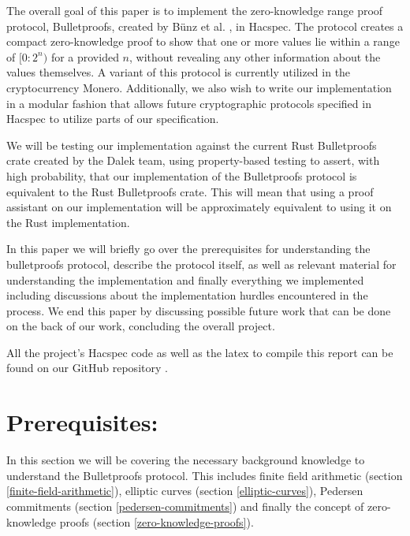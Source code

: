 \documentclass{article}
\begin{document}
The overall goal of this paper is to implement the zero-knowledge
range proof protocol, Bulletproofs, created by Bünz et
al. \cite{bulletproofs}, in Hacspec. The protocol creates a compact
zero-knowledge proof to show that one or more values lie within a
range of $[0:2^n)$ for a provided $n$, without revealing any other
information about the values themselves. A variant of this protocol
is currently utilized in the cryptocurrency Monero. Additionally,
we also wish to write our implementation in a modular fashion that
allows future cryptographic protocols specified in Hacspec to utilize
parts of our specification.

We will be testing our implementation against the current Rust
Bulletproofs crate \cite{dalek} created by the Dalek team, using property-based
testing to assert, with high probability, that our implementation of the
Bulletproofs protocol is equivalent to the Rust Bulletproofs crate. This
will mean that using a proof assistant on our implementation will be 
approximately equivalent to using it on the Rust implementation.

In this paper we will briefly go over the prerequisites for
understanding the bulletproofs protocol, describe the protocol itself,
as well as relevant material for understanding the implementation
and finally everything we implemented including discussions about the
implementation hurdles encountered in the process. We end this paper
by discussing possible future work that can be done on the back of
our work, concluding the overall project.

All the project's Hacspec code as well as the latex to
compile this report can be found on our GitHub repository
\cite{hacspec-bulletproofs}.


\newpage

\section{Prerequisites:} \label{prerequisites}

In this section we will be covering the necessary background
knowledge to understand the Bulletproofs protocol. This includes
finite field arithmetic (section \ref{finite-field-arithmetic}),
elliptic curves (section \ref{elliptic-curves}), Pedersen commitments
(section \ref{pedersen-commitments}) and finally the concept of
zero-knowledge proofs (section \ref{zero-knowledge-proofs}).
\end{document}
